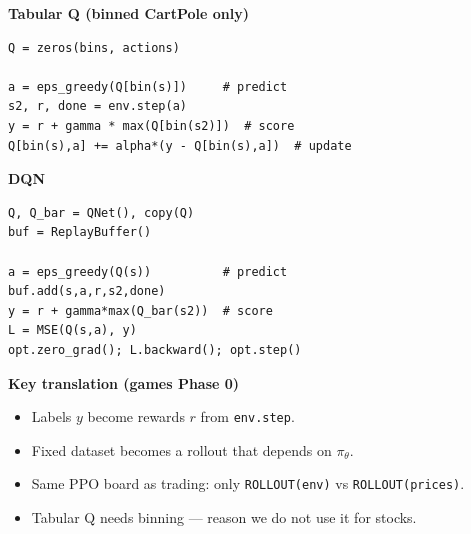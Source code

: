 \documentclass[10pt,a4paper]{article}
\begin{document}
\vspace{0.55em}
\noindent
\begin{minipage}[t]{0.48\textwidth}
\centering\textbf{Tabular Q (binned CartPole only)}\par\vspace{0.25em}
\begin{Verbatim}[fontsize=\tiny,frame=single,framesep=3pt]
Q = zeros(bins, actions)

a = eps_greedy(Q[bin(s)])     # predict
s2, r, done = env.step(a)
y = r + gamma * max(Q[bin(s2)])  # score
Q[bin(s),a] += alpha*(y - Q[bin(s),a])  # update
\end{Verbatim}
\end{minipage}\hfill
\begin{minipage}[t]{0.48\textwidth}
\centering\textbf{DQN}\par\vspace{0.25em}
\begin{Verbatim}[fontsize=\tiny,frame=single,framesep=3pt]
Q, Q_bar = QNet(), copy(Q)
buf = ReplayBuffer()

a = eps_greedy(Q(s))          # predict
buf.add(s,a,r,s2,done)
y = r + gamma*max(Q_bar(s2))  # score
L = MSE(Q(s,a), y)
opt.zero_grad(); L.backward(); opt.step()
\end{Verbatim}
\end{minipage}

\vspace{0.5em}
\noindent\textbf{Key translation (games Phase 0)}
\begin{itemize}\setlength\itemsep{0.1em}
  \item Labels $y$ become rewards $r$ from \texttt{env.step}.
  \item Fixed dataset becomes a rollout that depends on $\pi_\theta$.
  \item Same PPO board as trading: only \texttt{ROLLOUT(env)} vs \texttt{ROLLOUT(prices)}.
  \item Tabular Q needs binning --- reason we do not use it for stocks.
\end{itemize}
\end{document}
